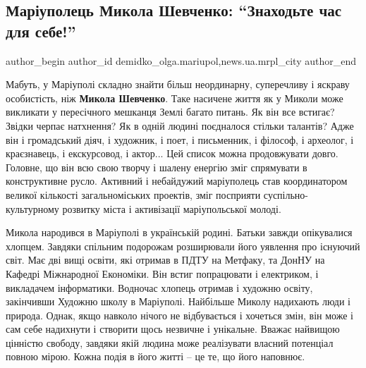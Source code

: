  
 
 
 
 
 
\subsection{Маріуполець Микола Шевченко: \enquote{Знаходьте час для себе!}}
\label{sec:26_07_2019.stz.news.ua.mrpl_city.1.mykola_shevchenko_chas_dlja_sebe}
 
\ifcmt
 author_begin
   author_id demidko_olga.mariupol,news.ua.mrpl_city
 author_end
\fi


Мабуть, у Маріуполі складно знайти більш неординарну, суперечливу і яскраву
особистість, ніж \textbf{Микола Шевченко}. Таке насичене життя як у Миколи може
викликати у пересічного мешканця Землі багато питань. Як він все встигає?
Звідки черпає натхнення? Як в одній людині поєдналося стільки талантів? Адже
він і громадський діяч, і художник, і поет, і письменник, і філософ, і
археолог, і краєзнавець, і екскурсовод, і актор... Цей список можна продовжувати
довго. Головне, що він всю свою творчу і шалену енергію зміг спрямувати в
конструктивне русло. Активний і небайдужий маріуполець став координатором
великої кількості загальноміських проектів, зміг посприяти
суспільно-культурному розвитку міста і активізації маріупольської молоді.


Микола народився в Маріуполі в українській родині. Батьки завжди опікувалися
хлопцем. Завдяки спільним подорожам розширювали його уявлення про існуючий
світ. Має дві вищі освіти, які отримав в ПДТУ на Метфаку, та ДонНУ на Кафедрі
Міжнародної Економіки. Він встиг попрацювати і електриком, і викладачем
інформатики. Водночас хлопець отримав і художню освіту, закінчивши Художню
школу в Маріуполі. Найбільше Миколу надихають люди і природа. Однак, якщо
навколо нічого не відбувається і хочеться змін, він може і сам себе надихнути і
створити щось незвичне і унікальне. Вважає найвищою цінністю свободу, завдяки
якій людина може реалізувати власний потенціал повною мірою. Кожна подія в його
житті – це те, що його наповнює.

